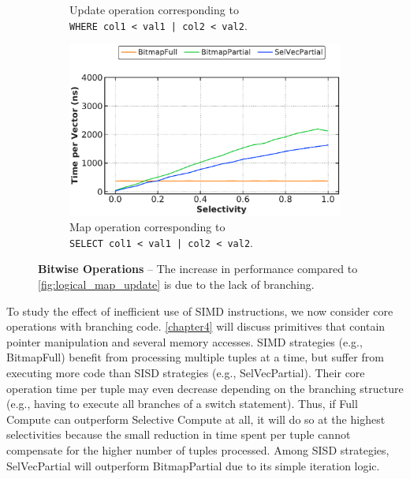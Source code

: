 \documentclass[12pt]{cmuthesis}
\begin{document}
\begin{figure}[t!]
\begin{subfigure}[t]{.49\linewidth}
 \caption{Update operation corresponding to \\ \texttt{\footnotesize WHERE col1 < val1 | col2 < val2}.}
  \label{fig:bitwise_or_update}
\end{subfigure}%
\begin{subfigure}[t]{.49\linewidth}
 \centering
 \includegraphics[width=0.9\linewidth]{eval/bitwise_or_map.pdf}
 \caption{Map operation corresponding to \\ \texttt{\footnotesize SELECT col1 < val1 | col2 < val2}.}
  \label{fig:bitwise_or_map}
\end{subfigure}

\caption{\textbf{Bitwise Operations} -- The increase in performance compared to \cref{fig:logical_map_update} is due to the lack of branching.}
\label{fig:bitwise_map_update}
\end{figure}

To study the effect of inefficient use of SIMD instructions, we now consider core operations with branching code. \cref{chapter4} will discuss primitives that contain pointer manipulation and several memory accesses. SIMD strategies (e.g., BitmapFull) benefit from processing multiple tuples at a time, but suffer from executing more code than SISD strategies (e.g., SelVecPartial). Their core operation time per tuple may even decrease depending on the branching structure (e.g., having to execute all branches of a switch statement).  Thus, if Full Compute can outperform Selective Compute at all, it will do so at the highest selectivities because the small reduction in time spent per tuple cannot compensate for the higher number of tuples processed. Among SISD strategies, SelVecPartial will outperform BitmapPartial due to its simple iteration logic.
\end{document}
